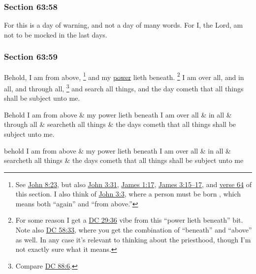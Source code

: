 	\subsubsection{Section 63:58} %
		\label{DC63-58}

		For this is a day of warning, and not a day of many words.  For I, the Lord, am not to be mocked in the last days.


	\subsubsection{Section 63:59} %
		\label{DC63-59}

		Behold, I am from above,%
			\footnote{%
				See \hyperref[JOHN-8-23]{John 8:23}, but also \hyperref[JOHN-3-31]{John 3:31}, \hyperref[JAMES-1-17]{James 1:17}, \hyperref[JAMES-3-15]{James 3:15--17}, and \hyperref[DC63-64]{verse 64} of this section. I also think of \hyperref[JOHN-3-3]{John 3:3}, where a person must be born , which means both ``again'' and ``from above.''
				}
		and my \hyperref[POWER]{power} lieth beneath.%
			\footnote{%
				For some reason I get a \hyperref[DC29-36]{DC 29:36} vibe from this ``power lieth beneath'' bit. Note also \hyperref[DC58-33]{DC 58:33}, where you get the combination of ``beneath'' and ``above'' as well. In any case it's relevant to thinking about the priesthood, though I'm not exactly sure what it means.
				}
		I am over all, and in all, and through all,%
			\footnote{%
				Compare \hyperref[DC88-6]{DC 88:6}.
				}
		and search all things, and the day cometh that all things shall be subject unto me.

		\begin{framed}
		\scriptsize
			\begin{compactdesc}
				\item[JSP] Behold I am from above \& my power lieth beneath I am over all \& in all \& through all \& searcheth all things \& the days cometh that all things shall be subject unto me.
				\item[RB1] behold I am from above \& my power lieth beneath I am over all \& in all \& searcheth all things \& the days cometh that all things shall be subject unto me
			\end{compactdesc}
		\end{framed}


